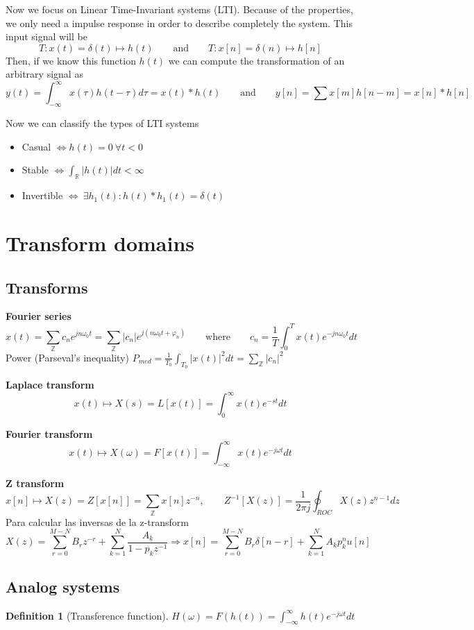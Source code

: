 \documentclass[leqno]{article}
\newtheorem{definition}[theorem]{Definition}
\begin{document}
Now we focus on Linear Time-Invariant systems (LTI). Because of the properties, we only need a impulse response in order to describe completely the system. This input signal will be 
\[
T: x(t) = \delta(t) \mapsto h(t) \qquad \text{and} \qquad 
T: x[n] = \delta(n) \mapsto h[n]
\]
Then, if we know this function $h(t)$ we can compute the transformation of an arbitrary signal as
 \[
y(t) = \int_{-\infty}^\infty x(\tau )h(t-\tau )d\tau = x(t)*h(t) \qquad \text{and} \qquad y[n] = \sum x[m]h[n-m] = x[n]*h[n]
\] 

Now we can classify the types of LTI systems
\begin{itemize}[topsep=-6pt, itemsep=0pt]
  \item Casual $\iff h(t)=0 \ \forall t<0$
  \item Stable $\iff \int_{\mathbb{R}} |h(t)|dt < \infty $ 
  \item Invertible $\iff \ \exists h_1(t): h(t)*h_1(t) = \delta(t)$
\end{itemize}

\section{Transform domains}
\subsection{Transforms}
\textbf{Fourier series}
\[
x(t) = \sum_{\mathbb{Z}} c_ne^{jn\omega _0 t} = \sum_{\mathbb{Z}} |c_n|e^{j(n\omega_0t + \varphi _n)} \qquad \text{where} \qquad c_n = \frac{1}{T}\int_{0}^T x(t)e^{-jn\omega _0t}dt
\] 
Power (Parseval's inequality) $\displaystyle P_{med}=\frac{1}{T_0}\int_{T_0 }|x(t)|^2dt = \sum_{\mathbb{Z}}|c_n|^2$

\textbf{Laplace transform}
\[
x(t)\mapsto X(s) = L[x(t)] = \int_0^{\infty} x(t)e^{-st}dt
\] 

\textbf{Fourier transform}
\[
x(t)\mapsto X(\omega ) = F[x(t)] = \int_{-\infty}^{\infty} x(t)e^{-j\omega t}dt
\] 

\textbf{Z transform}
\[
x[n]\mapsto X(z) = Z[x[n]] = \sum_{\mathbb{Z}} x[n] z^{-n} , \qquad Z^{-1}[X(z)]= \frac{1}{2\pi j}\oint_{ROC} X(z)z^{n-1}dz
\] 
Para calcular las inversas de la z-transform
\[
X(z)=\sum_{r=0}^{M-N}B_rz^{-r} + \sum_{k=1}^{N} \frac{A_k}{1-p_kz^{-1}} \Rightarrow x[n]= \sum_{r=0}^{M-N} B_r \delta[n-r] + \sum_{k=1}^{N} A_kp_k^n u[n]
\] 

\subsection{Analog systems}
\begin{definition}[Transference function]$H(\omega ) = F(h(t))=\int_{-\infty}^{\infty} h(t)e^{-j\omega t}dt$
\end{definition}
\end{document}
